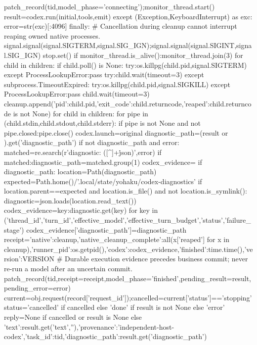         patch_record(tid,model_phase='connecting');monitor_thread.start()
        result=codex.run(initial,tools,emit)
    except (Exception,KeyboardInterrupt) as exc:
        error=str(exc)[:4096]
    finally:
        # Cancellation during cleanup cannot interrupt reaping owned native processes.
        signal.signal(signal.SIGTERM,signal.SIG_IGN);signal.signal(signal.SIGINT,signal.SIG_IGN)
        stop.set()
        if monitor_thread.is_alive():monitor_thread.join(3)
        for child in children:
            if child.poll() is None:
                try:os.killpg(child.pid,signal.SIGTERM)
                except ProcessLookupError:pass
                try:child.wait(timeout=3)
                except subprocess.TimeoutExpired:
                    try:os.killpg(child.pid,signal.SIGKILL)
                    except ProcessLookupError:pass
                    child.wait(timeout=3)
            cleanup.append({'pid':child.pid,'exit_code':child.returncode,'reaped':child.returncode is not None})
        for child in children:
            for pipe in (child.stdin,child.stdout,child.stderr):
                if pipe is not None and not pipe.closed:pipe.close()
        codex.launch=original
    diagnostic_path=(result or {}).get('diagnostic_path')
    if not diagnostic_path and error:
        matched=re.search(r'diagnostic: ([^\s]+\.json)',error)
        if matched:diagnostic_path=matched.group(1)
    codex_evidence={}
    if diagnostic_path:
        location=Path(diagnostic_path)
        expected=Path.home()/'.local/state/yohaku/codex-diagnostics'
        if location.parent==expected and location.is_file() and not location.is_symlink():
            diagnostic=json.loads(location.read_text())
            codex_evidence={key:diagnostic.get(key) for key in ('thread_id','turn_id','effective_model','effective_turn_budget','status','failure_stage')}
            codex_evidence['diagnostic_path']=diagnostic_path
    receipt={'native':cleanup,'native_cleanup_complete':all(x['reaped'] for x in cleanup),'runner_pid':os.getpid(),'codex':codex_evidence,'finished':time.time(),'version':VERSION}
    # Durable execution evidence precedes business commit; never re-run a model after an uncertain commit.
    patch_record(tid,receipt=receipt,model_phase='finished',pending_result=result,pending_error=error)
    current=obj.request(record['request_id']);cancelled=current['status']=='stopping'
    status='cancelled' if cancelled else 'done' if result is not None else 'error'
    reply=None if cancelled or result is None else {'text':result.get('text',''),'provenance':'independent-host-codex','task_id':tid,'diagnostic_path':result.get('diagnostic_path')}
